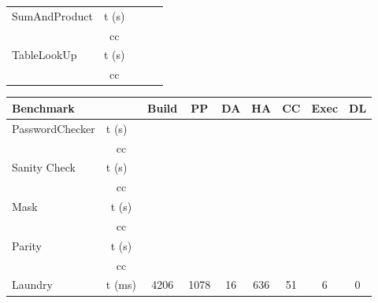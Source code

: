 \begin{center}
\begin{table}[]
\begin{tabular}{|l|c|l|l|l|}
    \multirow{2}{*}{SumAndProduct}   & \multicolumn{1}{l|}{t (s)} &    &         &               \\ \cline{2-5} 
                                     & cc                         &    &         &               \\ \hline
    \multirow{2}{*}{TableLookUp}     & \multicolumn{1}{l|}{t (s)} &    &         &               \\ \cline{2-5} 
                                     & cc                         &    &         &               \\ \hline
    \end{tabular}
    \end{table}
\end{center}

\begin{center}
    \begin{table}[]
        \begin{tabular}{|l|c|c|c|c|c|c|c|c|}
        \hline
        \textbf{Benchmark}               & \multicolumn{1}{l|}{}      & Build & PP & DA & HA & CC & Exec & DL \\ \hline
        \multirow{2}{*}{PasswordChecker} & \multicolumn{1}{l|}{t (s)} &       &    &    &    &    &      &    \\ \cline{2-9} 
                                         & cc                         &       &    &    &    &    &      &    \\ \hline
        \multirow{2}{*}{Sanity Check}    & \multicolumn{1}{l|}{t (s)} &       &    &    &    &    &      &    \\ \cline{2-9} 
                                         & cc                         &       &    &    &    &    &      &    \\ \hline
        \multirow{2}{*}{Mask}            & t (s)                      &       &    &    &    &    &      &    \\ \cline{2-9} 
                                         & cc                         &       &    &    &    &    &      &    \\ \hline
        \multirow{2}{*}{Parity}          & t (s)                      &       &    &    &    &    &      &    \\ \cline{2-9} 
                                         & cc                         &       &    &    &    &    &      &    \\ \hline
        \multirow{2}{*}{Laundry}         & t (ms)                      &  4206     &  1078  &  16  &  636  &  51  &  6    &  0  \\ \cline{2-9} 

\end{tabular}
\end{table}
\end{center}
